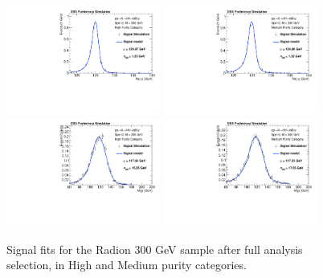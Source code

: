 \begin{figure}[thb]
  \centering
  \includegraphics[width=0.45\textwidth]{figures/sec-signals/Rad300_signal_fit_mgg_cat0}\hfil
  \includegraphics[width=0.45\textwidth]{figures/sec-signals/Rad300_signal_fit_mgg_cat1}\hfil
  \includegraphics[width=0.45\textwidth]{figures/sec-signals/Rad300_signal_fit_mjj_cat0}\hfil
  \includegraphics[width=0.45\textwidth]{figures/sec-signals/Rad300_signal_fit_mjj_cat1}\hfil
  \caption{Signal fits for the Radion 300 GeV sample after full analysis selection, in High and Medium purity categories.}
  \label{fig:rad300}
\end{figure}

